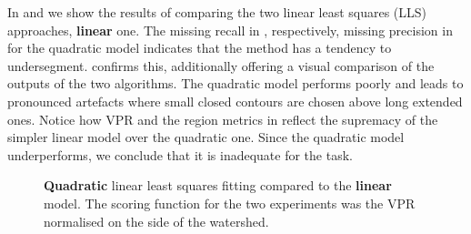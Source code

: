 In  and  we show the results of comparing the two linear least squares (LLS) approaches, %
{\bf linear}  one.
The missing recall in , respectively, missing precision in  for the quadratic model indicates that the method has a tendency to undersegment. 
 confirms this, additionally offering a visual comparison of the outputs of the two algorithms. The quadratic model performs poorly and leads to pronounced artefacts where small closed contours are chosen above long extended ones. Notice how VPR  and the region metrics in  reflect the supremacy of the simpler linear model over %
the quadratic one. %
Since the quadratic model underperforms, we conclude that it is inadequate for the task.

\begin{figure}[t]
\centering
\caption[{\bf Quadratic} LLS fitting compared to the {\bf linear} model - plots]{{\bf Quadratic} linear least squares fitting compared to the {\bf linear} model. The scoring function for the two experiments was the VPR normalised on the side of the watershed.}
\label{fig:quadratic-lls-fitting}
\end{figure}

